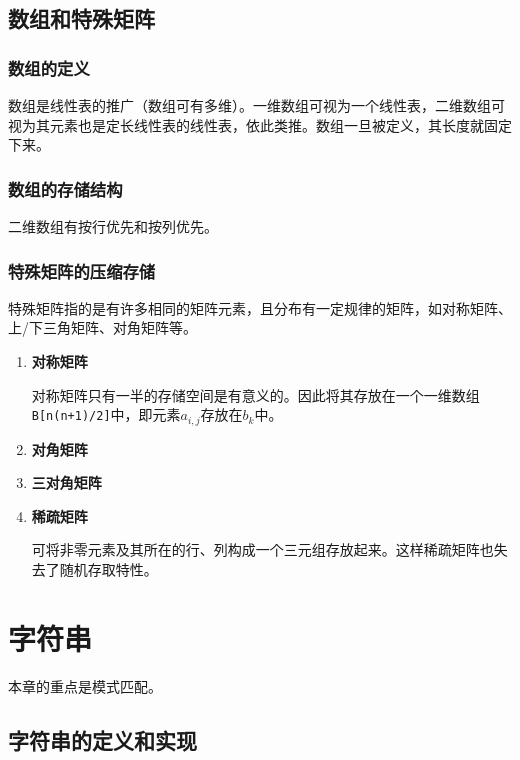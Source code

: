 \documentclass[12pt, a4paper, oneside]{ctexart}
\begin{document}
\subsection{数组和特殊矩阵}

\subsubsection{数组的定义}

数组是线性表的推广（数组可有多维）。一维数组可视为一个线性表，二维数组可视为其元素也是定长线性表的线性表，依此类推。数组一旦被定义，其长度就固定下来。

\subsubsection{数组的存储结构}

二维数组有按行优先和按列优先。

\subsubsection{特殊矩阵的压缩存储}

特殊矩阵指的是有许多相同的矩阵元素，且分布有一定规律的矩阵，如对称矩阵、上/下三角矩阵、对角矩阵等。

\begin{enumerate}
  \item {\bf 对称矩阵}
  
  对称矩阵只有一半的存储空间是有意义的。因此将其存放在一个一维数组\verb|B[n(n+1)/2]|中，即元素$a_{i,j}$存放在$b_k$中。

  \item {\bf 对角矩阵}
  
  \item {\bf 三对角矩阵}
  
  \item {\bf 稀疏矩阵}
  
  可将非零元素及其所在的行、列构成一个三元组存放起来。这样稀疏矩阵也失去了随机存取特性。
\end{enumerate}

\section{字符串}

本章的重点是模式匹配。

\subsection{字符串的定义和实现}
\end{document}
